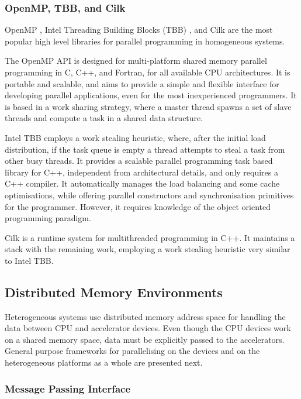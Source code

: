 \subsubsection*{OpenMP, TBB, and Cilk}

OpenMP \cite{OpenMP}, Intel Threading Building Blocks (TBB) \cite{Intel:TBB}, and Cilk \cite{CILK} are the most popular high level libraries for parallel programming in homogeneous systems.

The OpenMP API is designed for multi-platform shared memory parallel programming in C, C++, and Fortran, for all available CPU architectures. It is portable and scalable, and aims to provide a simple and flexible interface for developing parallel applications, even for the most inexperienced programmers. It is based in a work sharing strategy, where a master thread spawns a set of slave threads and compute a task in a shared data structure.

Intel TBB employs a work stealing heuristic, where, after the initial load distribution, if the task queue is empty a thread attempts to steal a task from other busy threads. It provides a scalable parallel programming task based library for C++, independent from architectural details, and only requires a C++ compiler. It automatically manages the load balancing and some cache optimisations, while offering parallel constructors and synchronisation primitives for the programmer. However, it requires knowledge of the object oriented programming paradigm.

Cilk is a runtime system for multithreaded programming in C++. It maintains a stack with the remaining work, employing a work stealing heuristic very similar to Intel TBB.

\subsection{Distributed Memory Environments}
\label{distributed_mem}

Heterogeneous systems use distributed memory address space for handling the data between CPU and accelerator devices. Even though the CPU devices work on a shared memory space, data must be explicitly passed to the accelerators. General purpose frameworks for parallelising on the devices and on the heterogeneous platforms as a whole are presented next.

\subsubsection*{Message Passing Interface}

